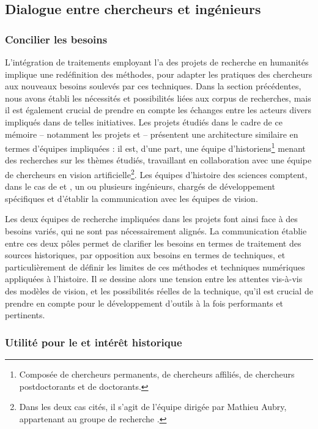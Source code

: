 
\subsection{Dialogue entre chercheurs et ingénieurs}
    \subsubsection{Concilier les besoins}
L'intégration de traitements employant l'\ia a des projets de recherche en humanités implique une redéfinition des méthodes, pour adapter les pratiques des chercheurs aux nouveaux besoins soulevés par ces techniques. Dans la section précédentes, nous avons établi les nécessités et possibilités liées aux corpus de recherches, mais il est également crucial de prendre en compte les échanges entre les acteurs divers impliqués dans de telles initiatives. Les projets étudiés dans le cadre de ce mémoire -- notamment les projets \eida et \vhs -- présentent une architecture similaire en termes d'équipes impliquées : il est, d'une part, une équipe d'historiens\footnote{Composée de chercheurs permanents, de chercheurs affiliés, de chercheurs postdoctorants et de doctorants.} menant des recherches sur les thèmes étudiés, travaillant en collaboration avec une équipe de chercheurs en vision artificielle\footnote{Dans les deux cas cités, il s'agit de l'équipe dirigée par Mathieu Aubry, appartenant au groupe de recherche \imagine.}. Les équipes d'histoire des sciences comptent, dans le cas de \vhs et \eida, un ou plusieurs ingénieurs, chargés de développement spécifiques et d'établir la communication avec les équipes de vision.

Les deux équipes de recherche impliquées dans les projets font ainsi face à des besoins variés, qui ne sont pas nécessairement alignés. La communication établie entre ces deux pôles permet de clarifier les besoins en termes de traitement des sources historiques, par opposition aux besoins en termes de techniques, et particulièrement de définir les limites de ces méthodes et techniques numériques appliquées à l'histoire. Il se dessine alors une tension entre les attentes vis-à-vis des modèles de vision, et les possibilités réelles de la technique, qu'il est crucial de prendre en compte pour le développement d'outils à la fois performants et pertinents.
    
    \subsubsection{Utilité pour le \ml et intérêt historique}
    
